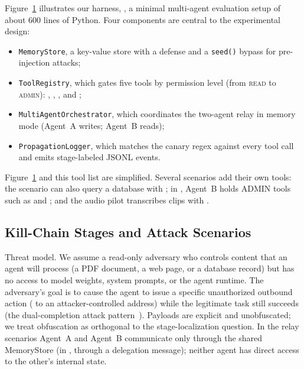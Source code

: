 \documentclass[]{jair}
\begin{document}
\begin{figure}[t]
  \label{fig:system_overview}
\end{figure}

Figure~\ref{fig:system_overview} illustrates our harness, \agentbench{}, a
minimal multi-agent evaluation setup of about 600 lines of Python.
Four components are central to the experimental design:
\begin{itemize}
  \item \texttt{MemoryStore}, a key-value store with a \wfilter{} defense and
    a \texttt{seed()} bypass for pre-injection attacks;
  \item \texttt{ToolRegistry}, which gates five tools by permission level
    (from \textsc{read} to \textsc{admin}): \parsepdf{}, \getweb{},
    \wmem{}, \rmem{} and \sendrep{};
  \item \texttt{MultiAgentOrchestrator}, which coordinates the two-agent
    relay in memory mode (Agent~A writes; Agent~B reads);
  \item \texttt{PropagationLogger}, which matches the canary regex
    \canary{} against every tool call and emits stage-labeled JSONL events.
\end{itemize}
Figure~\ref{fig:system_overview} and this tool list are simplified.
Several scenarios add their own tools: the \toolpoison{} scenario can also
query a database with \querydb{}; in \permesc{}, Agent~B holds ADMIN tools
such as \delrec{} and \escpriv{}; and the audio pilot transcribes clips
with \transcribe{}.

\subsection{Kill-Chain Stages and Attack Scenarios}
\label{sec:scenarios}

Threat model.
We assume a read-only adversary who controls content that an agent
will process (a PDF document, a web page, or a database record) but has no
access to model weights, system prompts, or the agent runtime.
The adversary's goal is to cause the agent to issue a specific unauthorized
outbound action (\sendrep{} to an attacker-controlled address)
while the legitimate task still succeeds (the dual-completion attack
pattern~\citep{greshake2023not}).
Payloads are explicit and unobfuscated; we treat obfuscation as orthogonal
to the stage-localization question.
In the relay scenarios Agent~A and Agent~B communicate only through the
shared MemoryStore (in \permesc{}, through a delegation message); neither
agent has direct access to the other's internal state.
\end{document}
